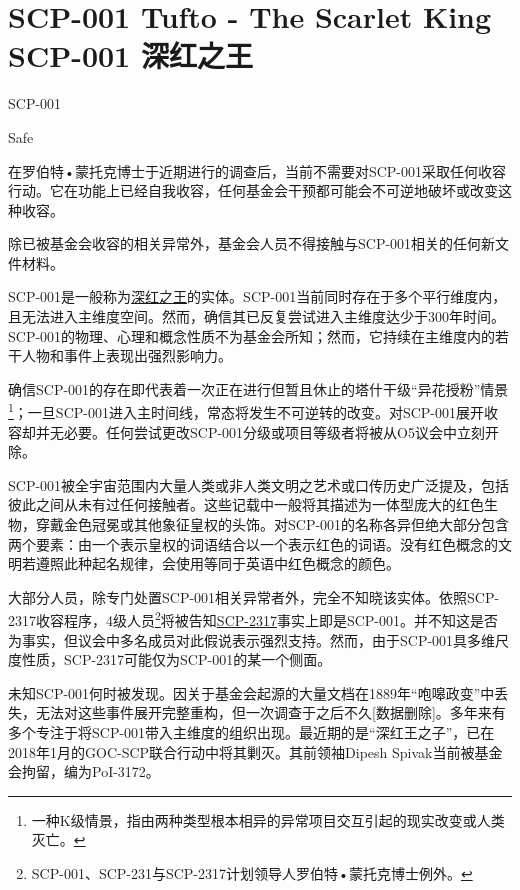 \chapter[SCP-001 深红之王]{
    SCP-001 Tufto - The Scarlet King\\
    SCP-001 深红之王
}

\label{chap:SCP-001.the.scarlet.king}

SCP-001

 Safe

在罗伯特•蒙托克博士于近期进行的调查后，当前不需要对SCP-001采取任何收容行动。它在功能上已经自我收容，任何基金会干预都可能会不可逆地破坏或改变这种收容。

除已被基金会收容的相关异常外，基金会人员不得接触与SCP-001相关的任何新文件材料。

SCP-001是一般称为\hyperref[chap:SCP-231]{深红之王}的实体。SCP-001当前同时存在于多个平行维度内，且无法进入主维度空间。然而，确信其已反复尝试进入主维度达少于300年时间。SCP-001的物理、心理和概念性质不为基金会所知；然而，它持续在主维度内的若干人物和事件上表现出强烈影响力。

确信SCP-001的存在即代表着一次正在进行但暂且休止的塔什干级“异花授粉”情景\footnote{一种K级情景，指由两种类型根本相异的异常项目交互引起的现实改变或人类灭亡。}；一旦SCP-001进入主时间线，常态将发生不可逆转的改变。对SCP-001展开收容却并无必要。任何尝试更改SCP-001分级或项目等级者将被从O5议会中立刻开除。

SCP-001被全宇宙范围内大量人类或非人类文明之艺术或口传历史广泛提及，包括彼此之间从未有过任何接触者。这些记载中一般将其描述为一体型庞大的红色生物，穿戴金色冠冕或其他象征皇权的头饰。对SCP-001的名称各异但绝大部分包含两个要素：由一个表示皇权的词语结合以一个表示红色的词语。没有红色概念的文明若遵照此种起名规律，会使用等同于英语中红色概念的颜色。

大部分人员，除专门处置SCP-001相关异常者外，完全不知晓该实体。依照SCP-2317收容程序，4级人员\footnote{SCP-001、SCP-231与SCP-2317计划领导人罗伯特•蒙托克博士例外。}将被告知\hyperref[chap:SCP-2317]{SCP-2317}事实上即是SCP-001。并不知这是否为事实，但议会中多名成员对此假说表示强烈支持。然而，由于SCP-001具多维尺度性质，SCP-2317可能仅为SCP-001的某一个侧面。

未知SCP-001何时被发现。因关于基金会起源的大量文档在1889年“咆嗥政变”中丢失，无法对这些事件展开完整重构，但一次调查于之后不久{[}数据删除]。多年来有多个专注于将SCP-001带入主维度的组织出现。最近期的是“深红王之子”，已在2018年1月的GOC-SCP联合行动中将其剿灭。其前领袖Dipesh Spivak当前被基金会拘留，编为PoI-3172。

